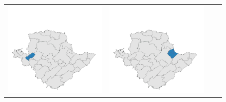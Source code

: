\begin{figure}[p]
\begin{tabularx}{1\textwidth}{XXXX}
\includegraphics[width=1\linewidth]{images/ch6/mergeoverall/07}&
\includegraphics[width=1\linewidth]{images/ch6/mergeoverall/08} \\

\end{tabularx}
\end{figure}
